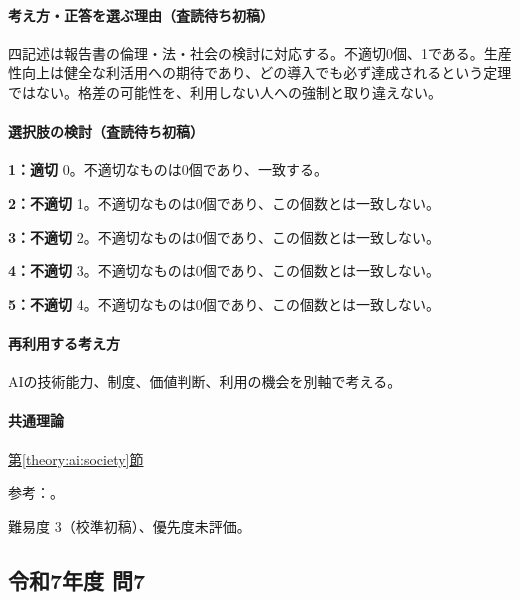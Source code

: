 \paragraph{考え方・正答を選ぶ理由（査読待ち初稿）} 四記述は報告書の倫理・法・社会の検討に対応する。不適切0個、1である。生産性向上は健全な利活用への期待であり、どの導入でも必ず達成されるという定理ではない。格差の可能性を、利用しない人への強制と取り違えない。

\paragraph{選択肢の検討（査読待ち初稿）}\mbox{}\par

\noindent\textbf{1：適切} 0。不適切なものは0個であり、一致する。\par

\noindent\textbf{2：不適切} 1。不適切なものは0個であり、この個数とは一致しない。\par

\noindent\textbf{3：不適切} 2。不適切なものは0個であり、この個数とは一致しない。\par

\noindent\textbf{4：不適切} 3。不適切なものは0個であり、この個数とは一致しない。\par

\noindent\textbf{5：不適切} 4。不適切なものは0個であり、この個数とは一致しない。\par

\paragraph{再利用する考え方} AIの技術能力、制度、価値判断、利用の機会を別軸で考える。

\paragraph{共通理論} \hyperref[theory:ai:society]{第\ref*{theory:ai:society}節}

\par 参考：\cite{ai_society2017}。

\par 難易度 3（校準初稿）、優先度未評価。

\subsection{令和7年度 問7}
\label{q:r07-reg-apt-07}

